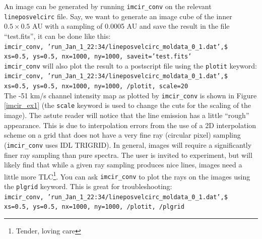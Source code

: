 \documentclass[11pt]{article}
\begin{document}
An image can be generated by running {\tt imcir\_conv} on the relevant {\tt lineposvelcirc} file. Say, we want to generate an image cube of the inner 
$0.5\times 0.5$ AU with a sampling of 0.0005 AU and save the result in the file ``test.fits'', it can be done like this:\\

{\tt imcir\_conv, 'run\_Jan\_1\_22:34/lineposvelcirc\_moldata\_0\_1.dat',\$\\
xs=0.5, ys=0.5, nx=1000, ny=1000, saveit='test.fits'}\\

{\tt imcir\_conv} will also plot the result to a postscript file using the {\tt plotit} keyword:\\

{\tt imcir\_conv, 'run\_Jan\_1\_22:34/lineposvelcirc\_moldata\_0\_1.dat',\$\\
 xs=0.5, ys=0.5, nx=1000, ny=1000, /plotit, scale=20}\\

The -51 km/s channel intensity map as plotted by {\tt imcir\_conv} is shown in Figure \ref{imcir_ex1} (the {\tt scale} keyword is used
to change the cuts for the scaling of the image). The astute reader will notice that the line emission has 
a little ``rough'' appearance. This is due to interpolation errors from the use of a 2D interpolation scheme on a grid that
does not have a very fine ray (circular pixel) sampling ({\tt imcir\_conv} uses
IDL TRIGRID). In general, images will require a significantly finer ray sampling than pure spectra. The user is invited to experiment, but will
likely find that while a given ray sampling produces nice lines, images need a little more TLC\footnote{Tender, loving care}. You can ask
{\tt imcir\_conv} to plot the rays on the images using the {\tt plgrid} keyword. This is great for troubleshooting: \\

{\tt imcir\_conv, 'run\_Jan\_1\_22:34/lineposvelcirc\_moldata\_0\_1.dat',\$\\
xs=0.5, ys=0.5, nx=1000, ny=1000, /plotit, /plgrid}\\
 
\end{document}
